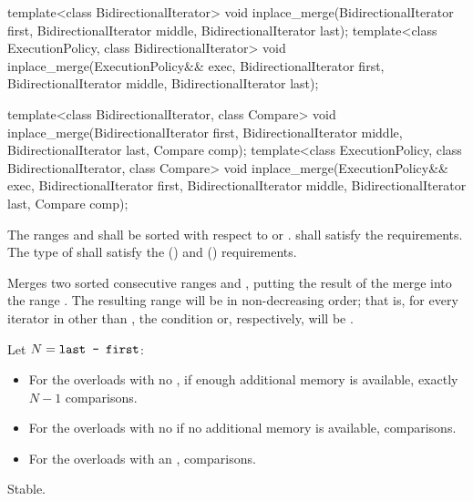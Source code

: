 %
\begin{itemdecl}
template<class BidirectionalIterator>
  void inplace_merge(BidirectionalIterator first,
                     BidirectionalIterator middle,
                     BidirectionalIterator last);
template<class ExecutionPolicy, class BidirectionalIterator>
  void inplace_merge(ExecutionPolicy&& exec,
                     BidirectionalIterator first,
                     BidirectionalIterator middle,
                     BidirectionalIterator last);

template<class BidirectionalIterator, class Compare>
  void inplace_merge(BidirectionalIterator first,
                     BidirectionalIterator middle,
                     BidirectionalIterator last, Compare comp);
template<class ExecutionPolicy, class BidirectionalIterator, class Compare>
  void inplace_merge(ExecutionPolicy&& exec,
                     BidirectionalIterator first,
                     BidirectionalIterator middle,
                     BidirectionalIterator last, Compare comp);
\end{itemdecl}

\begin{itemdescr}
\pnum
\requires
The ranges  and  shall be
sorted with respect to  or .
 shall satisfy the
 requirements. The type
of  shall satisfy the
 () and
 () requirements.

\pnum
\effects
Merges two sorted consecutive ranges
and
,
putting the result of the merge into the range
.
The resulting range will be in non-decreasing order;
that is, for every iterator
in
other than
,
the condition
or, respectively,
will be .

\pnum
\complexity Let $N = \texttt{last - first}$:
\begin{itemize}
\item For the overloads with no , if enough additional
memory is available, exactly $N - 1$ comparisons.
\item For the overloads with no  if no additional
memory is available,   comparisons.
\item For the overloads with an ,  comparisons.
\end{itemize}

\pnum
\remarks Stable.
\end{itemdescr}

